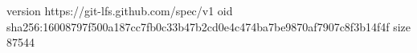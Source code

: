 version https://git-lfs.github.com/spec/v1
oid sha256:16008797f500a187cc7fb0c33b47b2cd0e4c474ba7be9870af7907c8f3b14f4f
size 87544
